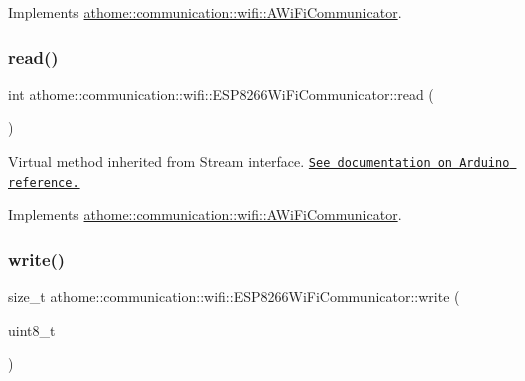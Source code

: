 Implements \mbox{\hyperlink{classathome_1_1communication_1_1wifi_1_1_a_wi_fi_communicator_ad5c39b1ea49f77026371c8e8ff2dba63}{athome\+::communication\+::wifi\+::\+A\+Wi\+Fi\+Communicator}}.

\mbox{\label{classathome_1_1communication_1_1wifi_1_1_e_s_p8266_wi_fi_communicator_a1cadc570e912c164279ef0ebc5b178a5}} 
\subsubsection{\texorpdfstring{read()}{read()}}
{\footnotesize\ttfamily int athome\+::communication\+::wifi\+::\+E\+S\+P8266\+Wi\+Fi\+Communicator\+::read (\begin{DoxyParamCaption}{ }\end{DoxyParamCaption})\hspace{0.3cm}{\ttfamily [virtual]}}

Virtual method inherited from Stream interface. \href{https://www.arduino.cc/reference/en/language/functions/communication/stream/streamread/}{\tt See documentation on Arduino reference.} 

Implements \mbox{\hyperlink{classathome_1_1communication_1_1wifi_1_1_a_wi_fi_communicator_ac18a51bba1651031d4ea2ac2d2a19606}{athome\+::communication\+::wifi\+::\+A\+Wi\+Fi\+Communicator}}.

\mbox{\label{classathome_1_1communication_1_1wifi_1_1_e_s_p8266_wi_fi_communicator_afd3c1c4ce7d68717a7bb2cf1b9dc962f}} 
\subsubsection{\texorpdfstring{write()}{write()}}
{\footnotesize\ttfamily size\+\_\+t athome\+::communication\+::wifi\+::\+E\+S\+P8266\+Wi\+Fi\+Communicator\+::write (\begin{DoxyParamCaption}\item[{uint8\+\_\+t}]{ }\end{DoxyParamCaption})\hspace{0.3cm}{\ttfamily [virtual]}}

